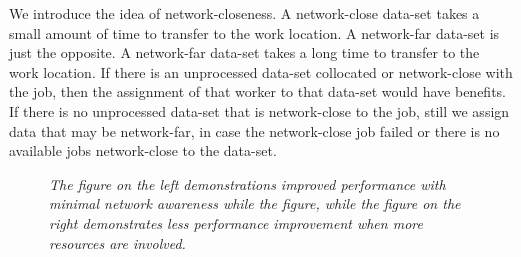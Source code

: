\documentclass{rspublic}
\begin{document}
We introduce the idea of network-closeness.  A network-close data-set
takes a small amount of time to transfer to the work location.  A
network-far data-set is just the opposite.  A network-far data-set takes
a long time to transfer to the work location.  If there is an
unprocessed data-set collocated or network-close with the job, then the
assignment of that worker to that data-set would have benefits.  If
there is no unprocessed data-set that is network-close to the job, still
we assign data that may be network-far, in case the network-close job
failed or there is no available jobs network-close to the data-set.
\begin{center}
\begin{figure}
\caption{\textit{The figure on the left demonstrations improved
performance with minimal network awareness while the figure, while the
figure on the right demonstrates less performance improvement when more
resources are involved.}}
\label{experiment2}
\end{figure}
\end{center}
\end{document}
